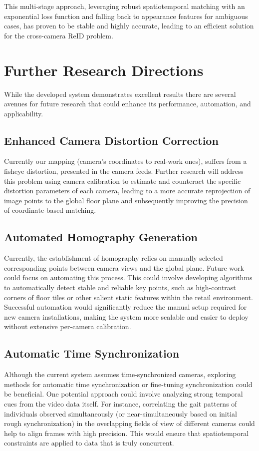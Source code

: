 \documentclass[12pt, a4paper]{article}
\begin{document}
This multi-stage approach, leveraging robust spatiotemporal matching with an exponential loss function and falling back to appearance features for ambiguous cases, has proven to be stable and highly accurate, leading to an efficient solution for the cross-camera ReID problem.


\section{Further Research Directions}
While the developed system demonstrates excellent results there are several avenues for future research that could enhance its performance, automation, and applicability.

\subsection{Enhanced Camera Distortion Correction}

Currently our mapping (camera's coordinates to real-work ones), suffers from a fisheye distortion, presented in the camera feeds. Further research will address this problem using camera calibration to estimate and counteract the specific distortion parameters of each camera, leading to a more accurate reprojection of image points to the global floor plane and subsequently improving the precision of coordinate-based matching.

\subsection{Automated Homography Generation}

Currently, the establishment of homography relies on manually selected corresponding points between camera views and the global plane. Future work could focus on automating this process. This could involve developing algorithms to automatically detect stable and reliable key points, such as high-contrast corners of floor tiles or other salient static features within the retail environment. Successful automation would significantly reduce the manual setup required for new camera installations, making the system more scalable and easier to deploy without extensive per-camera calibration.

\subsection{Automatic Time Synchronization}

Although the current system assumes time-synchronized cameras, exploring methods for automatic time synchronization or fine-tuning synchronization could be beneficial. One potential approach could involve analyzing strong temporal cues from the video data itself. For instance, correlating the gait patterns of individuals observed simultaneously (or near-simultaneously based on initial rough synchronization) in the overlapping fields of view of different cameras could help to align frames with high precision. This would ensure that spatiotemporal constraints are applied to data that is truly concurrent.
\end{document}
